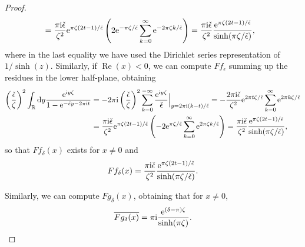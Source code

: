 \documentclass[pdftex]{sigma}
\numberwithin{equation}{section}
\begin{document}
\begin{proof}
\begin{align*}
 &=\frac{\pi \mathrm{i} \check{\epsilon}}{\zeta^2}{\rm e}^{\pi \zeta(2t-1)/\check{\epsilon}}\left(2{\rm e}^{-\pi \zeta/\check{\epsilon}}\sum_{k=0}^{\infty}{\rm e}^{-2\pi \zeta k/\check{\epsilon}}\right)=\frac{\pi \mathrm{i} \check{\epsilon}}{\zeta^2}\frac{{\rm e}^{\pi \zeta(2t-1)/\check{\epsilon}}}{\sinh(\pi \zeta/\check{\epsilon})},
 \end{align*}
where in the last equality we have used the Dirichlet series representation of $1/\sinh(z)$. Similarly, if $\operatorname{Re}(x)<0$, we can compute $Ff_{\epsilon}$ summing up the residues in the lower half-plane, obtaining
\begin{align*}
 \left(\frac{\check \epsilon}{\zeta}\right)^2\int_{\mathbb{R}}{\rm d}y \frac{{\rm e}^{\mathrm{i} y \zeta}}{1-{\rm e}^{-\check{\epsilon} y -2\pi \mathrm{i} t}}&=-2\pi \mathrm{i} \left(\frac{\check \epsilon}{\zeta}\right)^2\sum_{k=0}^{-\infty}\frac{{\rm e}^{\mathrm{i} y\zeta}}{\check{\epsilon}}\Big|_{y=2\pi \mathrm{i} (k-t)/\check{\epsilon}}=-\frac{2\pi \mathrm{i} \check\epsilon}{\zeta^2}{\rm e}^{2\pi t\zeta /\check{\epsilon}}\sum_{k=0}^{\infty}{\rm e}^{2\pi k\zeta/\check{\epsilon} }\\ &=\frac{\pi \mathrm{i} \check\epsilon}{\zeta^2}{\rm e}^{\pi \zeta(2t-1)/\check{\epsilon}}\left(-2{\rm e}^{\pi \zeta/\check{\epsilon}}\sum_{k=0}^{\infty}{\rm e}^{2\pi \zeta k/\check{\epsilon}}\right)=\frac{\pi \mathrm{i} \check\epsilon}{\zeta^2}\frac{{\rm e}^{\pi \zeta(2t-1)/\check{\epsilon}}}{\sinh(\pi \zeta/\check{\epsilon})},
\end{align*}
so that $Ff_{\delta}(x)$ exists for $x\neq 0$ and
\begin{equation*}
Ff_\delta(x)=\frac{\pi \mathrm{i} \check\epsilon}{\zeta^2}\frac{{\rm e}^{\pi \zeta(2t-1)/\check{\epsilon}}}{\sinh(\pi \zeta/\check{\epsilon})}.
\end{equation*}

Similarly, we can compute $Fg_\delta(x)$, obtaining that for $x\neq 0$,
\begin{equation*}
 \overline{Fg_\delta(x)}=\pi \mathrm{i} \frac{{\rm e}^{(\delta-\pi )\zeta}}{\sinh(\pi \zeta)}.
\end{equation*}


\end{proof}
\end{document}
